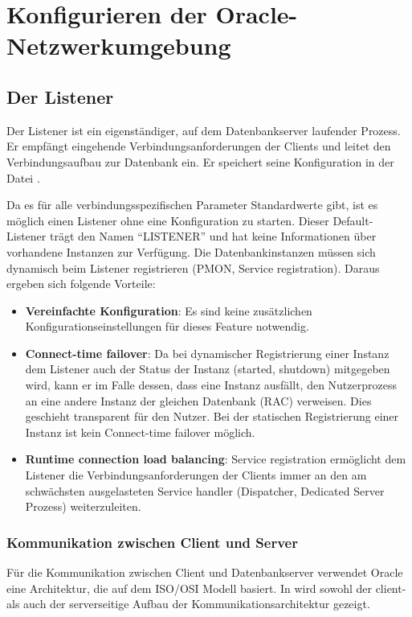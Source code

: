\chapter{Konfigurieren der Oracle-Netzwerkumgebung}
\chaptertoc{}
\cleardoubleevenpage

    \section{Der Listener}
      Der Listener ist ein eigenständiger, auf dem Datenbankserver laufender
      Prozess. Er empfängt eingehende Verbindungsanforderungen der Clients und
      leitet den Verbindungsaufbau zur Datenbank ein. Er speichert seine
      Konfiguration in der Datei .

      Da es für alle verbindungsspezifischen Parameter Standardwerte gibt, ist es möglich einen Listener ohne eine Konfiguration zu starten. Dieser Default-Listener trägt den Namen \enquote{LISTENER} und hat keine Informationen über vorhandene Instanzen zur Verfügung. Die Datenbankinstanzen müssen sich dynamisch beim Listener registrieren (PMON, Service registration). Daraus ergeben sich folgende Vorteile:
      \begin{itemize}
        \item \textbf{Vereinfachte Konfiguration}: Es sind keine zusätzlichen Konfigurationseinstellungen für dieses Feature notwendig.
        \item \textbf{Connect-time failover}: Da bei dynamischer Registrierung einer Instanz dem Listener auch der Status der Instanz (started, shutdown) mitgegeben wird, kann er im Falle dessen, dass eine Instanz ausfällt, den Nutzerprozess an eine andere Instanz der gleichen Datenbank (RAC) verweisen. Dies geschieht transparent für den Nutzer. Bei der statischen Registrierung einer Instanz ist kein Connect-time failover mög\-lich.
        \item \textbf{Runtime connection load balancing}: Service registration ermöglicht dem Listener die Verbindungsanforderungen der Clients immer an den am schwächsten ausgelasteten Service handler (Dispatcher, Dedicated Server Prozess) weiterzuleiten.
      \end{itemize}
      \subsection{Kommunikation zwischen Client und Server}
        Für die Kommunikation zwischen Client und Datenbankserver verwendet Oracle eine Architektur, die auf dem ISO/OSI Modell basiert.
        In  wird sowohl der client- als auch der serverseitige Aufbau der Kommunikationsarchitektur gezeigt.

